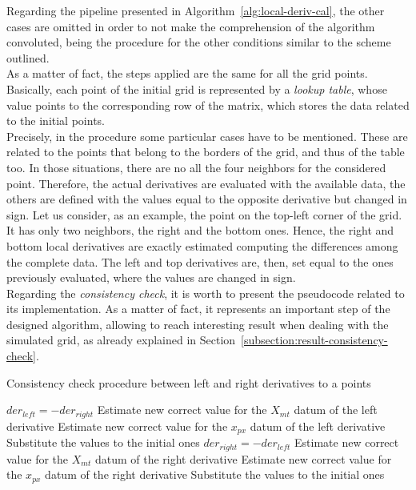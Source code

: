 Regarding the pipeline presented in Algorithm~\ref{alg:local-deriv-cal}, the other cases are omitted in order to not make the comprehension of the algorithm convoluted, being the procedure for the other conditions similar to the scheme outlined.\\
As a matter of fact, the steps applied are the same for all the grid points.
Basically, each point of the initial grid is represented by a \textit{lookup table}, whose value points to the corresponding row of the matrix, which stores the data related to the initial points.\\
Precisely, in the procedure some particular cases have to be mentioned.
These are related to the points that belong to the borders of the grid, and thus of the table too.
In those situations, there are no all the four neighbors for the considered point.
Therefore, the actual derivatives are evaluated with the available data, the others are defined with the values equal to the opposite derivative but changed in sign. 
Let us consider, as an example, the point on the top-left corner of the grid. 
It has only two neighbors, the right and the bottom ones. 
Hence, the right and bottom local derivatives are exactly estimated computing the differences among the complete data. 
The left and top derivatives are, then, set equal to the ones previously evaluated, where the values are changed in sign.\\
Regarding the \textit{consistency check}, it is worth to present the pseudocode related to its implementation.
As a matter of fact, it represents an important step of the designed algorithm, allowing to reach interesting result when dealing with the simulated grid, as already explained in Section~\ref{subsection:result-consistency-check}.

\begin{algorithm}
	\label{alg:consistency-check}
	\caption{Consistency check procedure between left and right derivatives to a points}
	\begin{algorithmic}[1]
				\State $der_{left} = -der_{right}$
			\Else
				\State Estimate new correct value for the $X_{mt}$ datum of the left derivative
				\State Estimate new correct value for the $x_{px}$ datum of the left derivative
				\State Substitute the values to the initial ones
			\EndIf		
		\EndIf
				\State $der_{right} = -der_{left}$
			\Else
				\State Estimate new correct value for the $X_{mt}$ datum of the right derivative
				\State Estimate new correct value for the $x_{px}$ datum of the right derivative
				\State Substitute the values to the initial ones
			\EndIf
		\EndIf
	\end{algorithmic} 
\end{algorithm} 


\begin{figure}[b]
	\begin{center}
	\end{center}
\end{figure}

